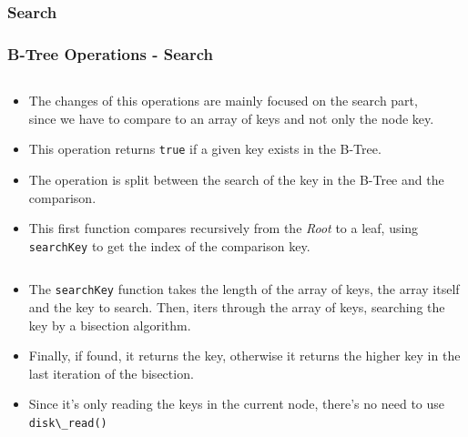\documentclass{beamer}
\begin{document}
\begin{frame}[t,allowframebreaks]
    \subsubsection{Search}
    \frametitle{B-Tree Operations - Search}
    \vspace{-1cm}
    \begin{columns}
        \begin{column}{\textlecolumn}
            \begin{block}{}
                \begin{itemize}
                    \item The changes of this operations are mainly focused on the search part, since we have to compare to an array of keys and not only the node key.
                    \item This operation returns \lstinline|true| if a given key exists in the B-Tree.
                    \item The operation is split between the search of the key in the B-Tree and the comparison.
                    \item This first function compares recursively from the \emph{Root} to a leaf, using \lstinline|searchKey| to get the index of the comparison key.
                \end{itemize}
            \end{block}
        \end{column}
        \begin{column}{\textricolumn}
        \end{column}
    \end{columns}
    \btreeSearch
    \vspace{-1cm}
    \begin{columns}
        \begin{column}{\textlecolumn}
            \begin{block}{}
                \begin{itemize}
                    \item The \lstinline|searchKey| function takes the length of the array of keys, the array itself and the key to search. Then, iters through the array of keys, searching the key by a bisection algorithm.
                    \item Finally, if found, it returns the key, otherwise it returns the higher key in the last iteration of the bisection.
                    \item Since it's only reading the keys in the current node, there's no need to use \lstinline|disk\_read()|

\end{itemize}
\end{block}
\end{column}
\end{columns}
\end{frame}
\end{document}
